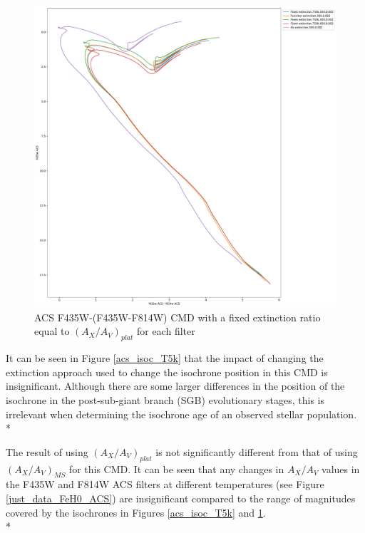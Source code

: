 \documentclass[12pt, a4paper]{report}
\begin{document}
\begin{figure}[h]
\begin{center}
\includegraphics[scale=0.25]{../basti_isochrones_10_13Gyr/Extinction_T50k_FeH0fix_func_f435wACS_f435wACSmf814wACS_500_400_600_Myr_FeH_0p002_ref_noext_Av_1p0.pdf}
\caption{ACS F435W-(F435W-F814W) CMD with a fixed extinction ratio equal to $(A_{X}/A_{V})_{plat}$ for each filter}
\label{acs_isoc_T50k}
\end{center}
\end{figure}

It can be seen in Figure \ref{acs_isoc_T5k} that the impact of changing the extinction approach used to change the isochrone position in this CMD is insignificant. Although there are some larger differences in the position of the isochrone in the post-sub-giant branch (SGB) evolutionary stages, this is irrelevant when determining the isochrone age of an observed stellar population.\\*

The result of using $(A_{X}/A_{V})_{plat}$ is not significantly different from that of using $(A_{X}/A_{V})_{MS}$ for this CMD. It can be seen that any changes in $A_{X}/A_{V}$ values in the F435W and F814W ACS filters at different temperatures (see Figure \ref{just_data_FeH0_ACS}) are insignificant compared to the range of magnitudes covered by the isochrones in Figures \ref{acs_isoc_T5k} and \ref{acs_isoc_T50k}.\\*
\end{document}
